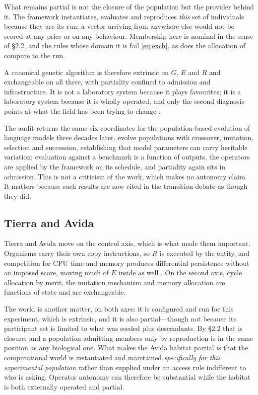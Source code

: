 \documentclass[review,3p,times]{elsarticle}
\begin{document}
What remains partial is not the closure of the population but the provider
behind it. The framework instantiates, evaluates and reproduces \emph{this}
set of individuals because they are its run; a vector arriving from anywhere
else would not be scored at any price or on any behaviour. Membership here is
nominal in the sense of \S2.2, and the rules whose domain it is fail
\eqref{eq:exch}, as does the allocation of compute to the run.

A canonical genetic algorithm is therefore extrinsic on $G$, $E$ and $R$ and
exchangeable on all three, with partiality confined to admission and
infrastructure. It is not a laboratory system because it plays favourites; it
is a laboratory system because it is wholly operated, and only the second
diagnosis points at what the field has been trying to change
\citep{utimula2025}.

The audit returns the same six coordinates for the population-based evolution
of language models three decades later. \citet{zhang2026} evolve populations
with crossover, mutation, selection and succession, establishing that model
parameters can carry heritable variation; evaluation against a benchmark is a
function of outputs, the operators are applied by the framework on its
schedule, and partiality again sits in admission. This is not a criticism of
the work, which makes no autonomy claim. It matters because such results are
now cited in the transition debate as though they did.

\subsection{Tierra and Avida}

Tierra and Avida move on the control axis, which is what made them important.
Organisms carry their own copy instructions, so $R$ is executed by the entity,
and competition for CPU time and memory produces differential persistence
without an imposed score, moving much of $E$ inside as well
\citep{ray1991,ofria2004}. On the second axis, cycle allocation by merit, the
mutation mechanism and memory allocation are functions of state and are
exchangeable.

The world is another matter, on both axes: it is configured and run for this
experiment, which is extrinsic, and it is also partial---though not because
its participant set is limited to what was seeded plus descendants. By \S2.2
that is closure, and a population admitting members only by reproduction is in
the same position as any biological one. What makes the Avida habitat partial
is that the computational world is instantiated and maintained
\emph{specifically for this experimental population} rather than supplied
under an access rule indifferent to who is asking. Operator autonomy can
therefore be substantial while the habitat is both externally operated and
partial.
\end{document}
